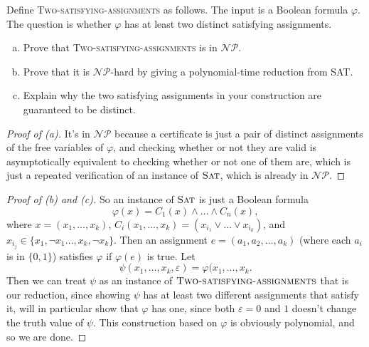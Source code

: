 \documentclass[11pt,a4paper]{article}
\newcommand{\problem}[1]{\textsc{#1}}
\begin{document}
\begin{assignment}
 Define \problem{Two-satisfying-assignments} as follows. The input is a Boolean formula $\varphi$. The question is whether $\varphi$ has at least two distinct satisfying assignments.
\begin{enumerate}[(a)]
 \item Prove that \problem{Two-satisfying-assignments} is in $\mathcal{NP}$.
 \item Prove that it is $\mathcal{NP}$-hard by giving a polynomial-time reduction from \problem{SAT}.
 \item Explain why the two satisfying assignments in your construction are guaranteed to be distinct.
\end{enumerate}
\begin{proof}[Proof of (a)]
 It's in $\mathcal{NP}$ because a certificate is just a pair of distinct assignments of the free variables of $\varphi$, and checking whether or not they are valid is asymptotically equivalent  to checking whether or not one of them are, which is just a repeated verification of an instance of $\problem{Sat}$, which is already in $\mathcal{NP}$.
\end{proof}

\begin{proof}[Proof of (b) and (c)]
 So an instance of $\problem{Sat}$ is just a Boolean formula \[
 \varphi(x) = C_1 (x)\land \ldots \land C_{n}(x), 
\]
  where $x = (x_1,\ldots,x_{k}) $, $C_{i}(x_1,\ldots,x_{k}) = (x_{i_1} \lor \ldots \lor x_{i_{k}})$, and $x_{i_{j}} \in \{ x_1, \neg x_1 \ldots,x_{k}, \neg x_{k}\}$.
Then an assignment $e = (a_1,a_2,\ldots,a_{k})$ (where each $a_{i}$ is in $\{0,1\}$) satisfies $\varphi$ if $\varphi(e)$ is true.
Let \[
\psi(x_1,\ldots,x_{k}, \varepsilon) = \varphi(x_1,\ldots,x_{k}.
 \] Then we can treat $\psi$ as an instance of $\problem{Two-satisfying-assignments}$ that is our reduction, since showing $\psi$ has at least two different assignments that satisfy it, will in particular show that $\varphi$ has one, since both $\varepsilon = 0$ and $1$ doesn't change the truth value of $\psi$. This construction based on $\varphi$ is obviously polynomial, and so we are done.
\end{proof}
\end{assignment}
\end{document}
